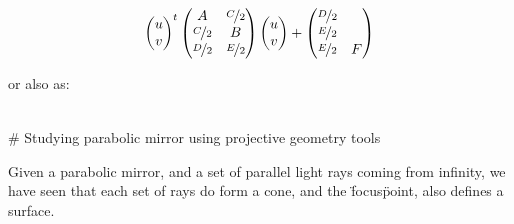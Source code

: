 \begin{align}
\begin{pmatrix}u \\ v\end{pmatrix}^{t}
\begin{pmatrix}
    A               & \nicefrac{C}{2}\\
    \nicefrac{C}{2} & B              \\
    \nicefrac{D}{2} & \nicefrac{E}{2}
\end{pmatrix}
\begin{pmatrix}u \\ v\end{pmatrix} +
\begin{pmatrix}
    \nicefrac{D}{2}\\
    \nicefrac{E}{2}\\
    \nicefrac{E}{2} & F
\end{pmatrix}
\end{align}

or also as:

\begin{align}
\end{align}

# Studying parabolic mirror using projective geometry tools

Given a parabolic mirror, and a set of parallel light rays coming from infinity, we have seen that each set of rays do form a cone, and the \"focus\" point, also defines a surface.
